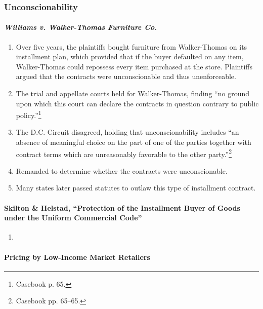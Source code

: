 \subsubsection{Unconscionability}

\paragraph{\emph{Williams v. Walker-Thomas Furniture Co.}}

\begin{enumerate}
    \item Over five years, the plaintiffs bought furniture from Walker-Thomas 
    on its installment plan, which provided that if the buyer defaulted on any 
    item, Walker-Thomas could repossess every item purchased at the store. 
    Plaintiffs argued that the contracts were unconscionable and thus 
    unenforceable.
    \item The trial and appellate courts held for Walker-Thomas, finding ``no 
    ground upon which this court can declare the contracts in question 
    contrary to public policy.''\footnote{Casebook p. 65.}
    \item The D.C. Circuit disagreed, holding that unconscionability includes 
    ``an absence of meaningful choice on the part of one of the parties 
    together with contract terms which are unreasonably favorable to the other 
    party.''\footnote{Casebook pp. 65--65.}
    \item Remanded to determine whether the contracts were unconscionable.
    \item Many states later passed statutes to outlaw this type of installment 
    contract.
\end{enumerate}
 
\paragraph{Skilton \& Helstad, ``Protection of the Installment Buyer of 
Goods under the Uniform Commercial Code''}

\begin{enumerate}
    \item %
\end{enumerate}
 
\paragraph{Pricing by Low-Income Market Retailers}

